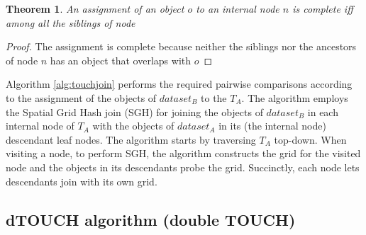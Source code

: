 \documentclass{vldb}
\newtheorem{theorem}{Theorem}
\newcommand{\SJ}{TOUCH}
\newcommand{\dSJ}{dTOUCH}
\begin{document}
\begin{theorem}\label{Theorem:correctAssignment}
An assignment of an object $o$ to an internal node $n$ is complete iff among all the siblings of node %
\end{theorem}
\begin{proof}
The assignment is complete because neither the siblings nor the ancestors of node $n$ has an object that overlaps with $o$
\end{proof}


\begin{algorithm}
\caption{TOUCH algorithm, Join step}\label{alg:touchjoin}
\begin{algorithmic}[1]
  \EndFor
  \EndFor
\EndFunction
\end{algorithmic}
\end{algorithm}

Algorithm \ref{alg:touchjoin} performs the required pairwise comparisons according to the assignment of the objects of $dataset_B$ to the $T_A$. The algorithm employs the Spatial Grid Hash join (SGH) for joining the objects of $dataset_B$ in each internal node of $T_A$ with the objects of $dataset_A$ in its (the internal node) descendant leaf nodes. The algorithm starts by traversing $T_A$ top-down. When visiting a node, to perform SGH, the algorithm constructs the grid for the visited node and the objects in its descendants probe the grid. Succinctly, each node lets descendants join with its own grid.


\subsection{{\dSJ} algorithm (double {\SJ})}
\end{document}
